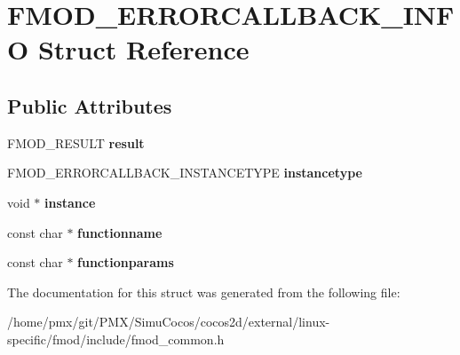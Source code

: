 \hypertarget{structFMOD__ERRORCALLBACK__INFO}{}\section{F\+M\+O\+D\+\_\+\+E\+R\+R\+O\+R\+C\+A\+L\+L\+B\+A\+C\+K\+\_\+\+I\+N\+FO Struct Reference}
\label{structFMOD__ERRORCALLBACK__INFO}
\subsection*{Public Attributes}
\begin{DoxyCompactItemize}
\item 
\mbox{\label{structFMOD__ERRORCALLBACK__INFO_ac0e254718b8b463f09d86a2de4a5e087}} 
F\+M\+O\+D\+\_\+\+R\+E\+S\+U\+LT {\bfseries result}
\item 
\mbox{\label{structFMOD__ERRORCALLBACK__INFO_a63854db5f977c7f504e42f838143c015}} 
F\+M\+O\+D\+\_\+\+E\+R\+R\+O\+R\+C\+A\+L\+L\+B\+A\+C\+K\+\_\+\+I\+N\+S\+T\+A\+N\+C\+E\+T\+Y\+PE {\bfseries instancetype}
\item 
\mbox{\label{structFMOD__ERRORCALLBACK__INFO_a1df1960e75ac605fa863d33facac399a}} 
void $\ast$ {\bfseries instance}
\item 
\mbox{\label{structFMOD__ERRORCALLBACK__INFO_add508279d8caeafbcf8edac8df2d5802}} 
const char $\ast$ {\bfseries functionname}
\item 
\mbox{\label{structFMOD__ERRORCALLBACK__INFO_aa65ddf6d01054310582cdbc46ebed13e}} 
const char $\ast$ {\bfseries functionparams}
\end{DoxyCompactItemize}


The documentation for this struct was generated from the following file\+:\begin{DoxyCompactItemize}
\item 
/home/pmx/git/\+P\+M\+X/\+Simu\+Cocos/cocos2d/external/linux-\/specific/fmod/include/fmod\+\_\+common.\+h\end{DoxyCompactItemize}
